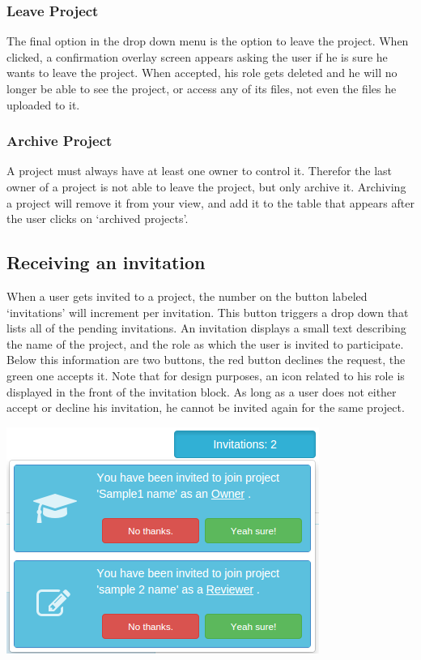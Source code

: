 \subsubsection{Leave Project}

The final option in the drop down menu is the option to leave the project. When clicked, a confirmation overlay screen appears asking the user if he is sure he wants to leave the project. When accepted, his role gets deleted and he will no longer be able to see the project, or access any of its files, not even the files he uploaded to it. 

\subsubsection{Archive Project}

A project must always have at least one owner to control it. Therefor the last owner of a project is not able to leave the project, but only archive it. Archiving a project will remove it from your view, and add it to the table that appears after the user clicks on `archived projects'.

\subsection{Receiving an invitation}

When a user gets invited to a project, the number on the button labeled `invitations' will increment per invitation. This button triggers a drop down that lists all of the pending invitations. An invitation displays a small text describing the name of the project, and the role as which the user is invited to participate. Below this information are two buttons, the red button declines the request, the green one accepts it. Note that for design purposes, an icon related to his role is displayed in the front of the invitation block. As long as a user does not either accept or decline his invitation, he cannot be invited again for the same project.

\begin{center}
\includegraphics[scale=0.5]{./img/invitation.png}
\end{center}

